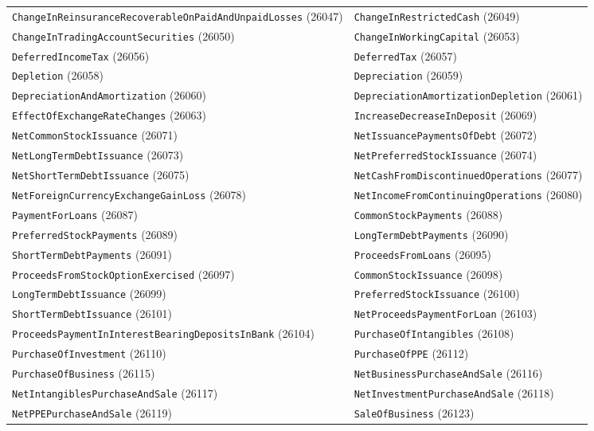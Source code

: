 \documentclass[11pt,a4paper]{report}
\begin{document}
\begin{subappendices}
{\begin{longtable}{@{}p{}p{}@{}}
\texttt{ChangeInReinsuranceRecoverableOnPaidAndUnpaidLosses} (26047) & \texttt{ChangeInRestrictedCash} (26049) \\
\texttt{ChangeInTradingAccountSecurities} (26050) & \texttt{ChangeInWorkingCapital} (26053) \\
\texttt{DeferredIncomeTax} (26056) & \texttt{DeferredTax} (26057) \\
\texttt{Depletion} (26058) & \texttt{Depreciation} (26059) \\
\texttt{DepreciationAndAmortization} (26060) & \texttt{DepreciationAmortizationDepletion} (26061) \\
\texttt{EffectOfExchangeRateChanges} (26063) & \texttt{IncreaseDecreaseInDeposit} (26069) \\
\texttt{NetCommonStockIssuance} (26071) & \texttt{NetIssuancePaymentsOfDebt} (26072) \\
\texttt{NetLongTermDebtIssuance} (26073) & \texttt{NetPreferredStockIssuance} (26074) \\
\texttt{NetShortTermDebtIssuance} (26075) & \texttt{NetCashFromDiscontinuedOperations} (26077) \\
\texttt{NetForeignCurrencyExchangeGainLoss} (26078) & \texttt{NetIncomeFromContinuingOperations} (26080) \\
\texttt{PaymentForLoans} (26087) & \texttt{CommonStockPayments} (26088) \\
\texttt{PreferredStockPayments} (26089) & \texttt{LongTermDebtPayments} (26090) \\
\texttt{ShortTermDebtPayments} (26091) & \texttt{ProceedsFromLoans} (26095) \\
\texttt{ProceedsFromStockOptionExercised} (26097) & \texttt{CommonStockIssuance} (26098) \\
\texttt{LongTermDebtIssuance} (26099) & \texttt{PreferredStockIssuance} (26100) \\
\texttt{ShortTermDebtIssuance} (26101) & \texttt{NetProceedsPaymentForLoan} (26103) \\
\texttt{ProceedsPaymentInInterestBearingDepositsInBank} (26104) & \texttt{PurchaseOfIntangibles} (26108) \\
\texttt{PurchaseOfInvestment} (26110) & \texttt{PurchaseOfPPE} (26112) \\
\texttt{PurchaseOfBusiness} (26115) & \texttt{NetBusinessPurchaseAndSale} (26116) \\
\texttt{NetIntangiblesPurchaseAndSale} (26117) & \texttt{NetInvestmentPurchaseAndSale} (26118) \\
\texttt{NetPPEPurchaseAndSale} (26119) & \texttt{SaleOfBusiness} (26123) \\

\end{longtable}}
\end{subappendices}
\end{document}
